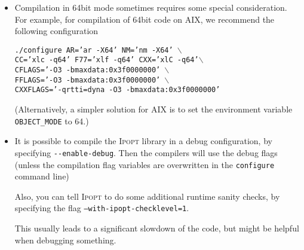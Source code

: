 \documentclass[10pt]{article}
\newcommand{\Ipopt}{\textsc{Ipopt}\xspace}
\begin{document}
\begin{itemize}
\item Compilation in 64bit mode sometimes requires some special
  consideration.  For example, for compilation of 64bit code on AIX,
  we recommend the following configuration

  {\tt ./configure AR='ar -X64' NM='nm -X64' $\backslash$\\
    \hspace*{14ex} CC='xlc -q64' F77='xlf -q64' CXX='xlC
    -q64'$\backslash$\\ \hspace*{14ex} CFLAGS='-O3
    -bmaxdata:0x3f0000000'
    $\backslash$\\ \hspace*{14ex} FFLAGS='-O3 -bmaxdata:0x3f0000000' $\backslash$\\
    \hspace*{14ex} CXXFLAGS='-qrtti=dyna -O3 -bmaxdata:0x3f0000000'}

  (Alternatively, a simpler solution for AIX is to set the environment variable {\tt OBJECT\_MODE} to 64.)



\item It is possible to compile the \Ipopt library in a debug
  configuration, by specifying \verb|--enable-debug|.  Then the
  compilers will use the debug flags (unless the compilation flag
  variables are overwritten in the {\tt configure} command line)

  Also, you can tell \Ipopt to do some additional runtime sanity
  checks, by specifying the flag {\tt --with-ipopt-checklevel=1}.

  This usually leads to a significant slowdown of the code, but might
  be helpful when debugging something.


\end{itemize}
\end{document}
